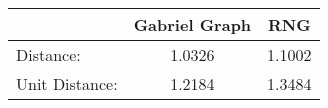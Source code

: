 \begin{tabular}{l|c|c|}
 & Gabriel Graph & RNG\\
\hline
Distance: & 1.0326 & 1.1002\\
Unit Distance: & 1.2184 & 1.3484\\
\end{tabular}